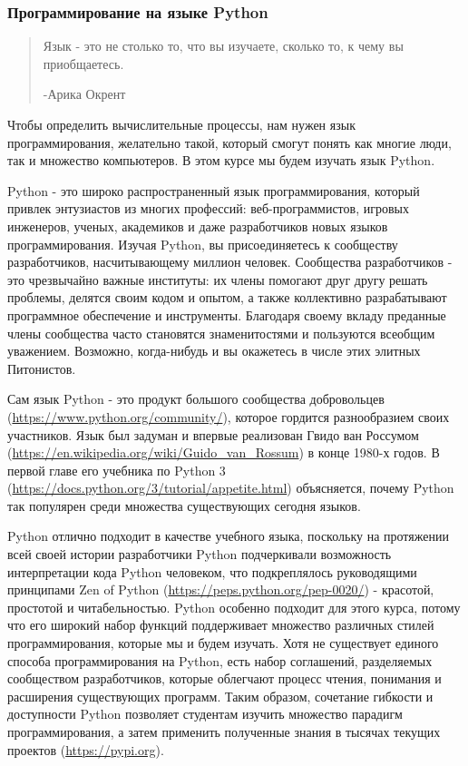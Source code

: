 \subsubsection{Программирование на языке Python}
\begin{quotation}
Язык - это не столько то, что вы изучаете, сколько то, к чему вы приобщаетесь.

-Арика Окрент
\end{quotation}

Чтобы определить вычислительные процессы, нам нужен язык программирования, желательно такой, который смогут понять как многие люди, так и множество компьютеров. В этом курсе мы будем изучать язык Python.

Python - это широко распространенный язык программирования, который привлек энтузиастов из многих профессий: веб-программистов, игровых инженеров, ученых, академиков и даже разработчиков новых языков программирования. Изучая Python, вы присоединяетесь к сообществу разработчиков, насчитывающему миллион человек. Сообщества разработчиков - это чрезвычайно важные институты: их члены помогают друг другу решать проблемы, делятся своим кодом и опытом, а также коллективно разрабатывают программное обеспечение и инструменты. Благодаря своему вкладу преданные члены сообщества часто становятся знаменитостями и пользуются всеобщим уважением. Возможно, когда-нибудь и вы окажетесь в числе этих элитных Питонистов.

Сам язык Python - это продукт большого сообщества добровольцев (\url{https://www.python.org/community/}), которое гордится разнообразием своих участников. Язык был задуман и впервые реализован Гвидо ван Россумом (\url{https://en.wikipedia.org/wiki/Guido_van_Rossum}) в конце 1980-х годов. В первой главе его учебника по Python 3 (\url{https://docs.python.org/3/tutorial/appetite.html}) объясняется, почему Python так популярен среди множества существующих сегодня языков.

Python отлично подходит в качестве учебного языка, поскольку на протяжении всей своей истории разработчики Python подчеркивали возможность интерпретации кода Python человеком, что подкреплялось руководящими принципами Zen of Python (\url{https://peps.python.org/pep-0020/}) - красотой, простотой и читабельностью. Python особенно подходит для этого курса, потому что его широкий набор функций поддерживает множество различных стилей программирования, которые мы и будем изучать. Хотя не существует единого способа программирования на Python, есть набор соглашений, разделяемых сообществом разработчиков, которые облегчают процесс чтения, понимания и расширения существующих программ. Таким образом, сочетание гибкости и доступности Python позволяет студентам изучить множество парадигм программирования, а затем применить полученные знания в тысячах текущих проектов (\url{https://pypi.org}).

